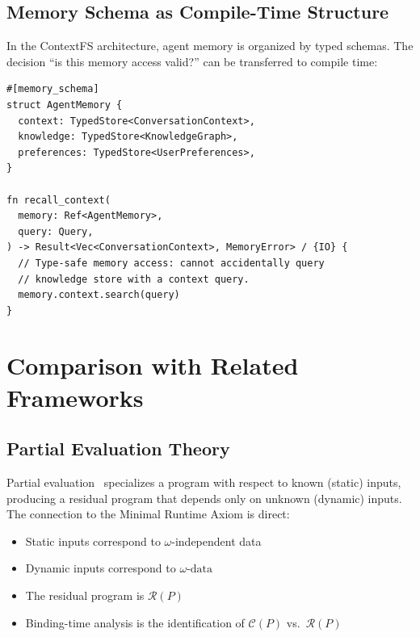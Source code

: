 \documentclass[11pt]{article}
\newcommand{\CP}{\mathcal{C}(P)}
\newcommand{\RP}{\mathcal{R}(P)}
\newcommand{\omegadata}{\omega\text{-data}}
\begin{document}
\subsection{Memory Schema as Compile-Time Structure}

In the ContextFS architecture, agent memory is organized by typed schemas. The decision
``is this memory access valid?'' can be transferred to compile time:

\begin{lstlisting}[caption={Typed agent memory in JAPL}]
#[memory_schema]
struct AgentMemory {
  context: TypedStore<ConversationContext>,
  knowledge: TypedStore<KnowledgeGraph>,
  preferences: TypedStore<UserPreferences>,
}

fn recall_context(
  memory: Ref<AgentMemory>,
  query: Query,
) -> Result<Vec<ConversationContext>, MemoryError> / {IO} {
  // Type-safe memory access: cannot accidentally query
  // knowledge store with a context query.
  memory.context.search(query)
}
\end{lstlisting}


\section{Comparison with Related Frameworks}
\label{sec:related}

\subsection{Partial Evaluation Theory}

Partial evaluation~\cite{jones1993partial} specializes a program with respect to known
(static) inputs, producing a residual program that depends only on unknown (dynamic)
inputs. The connection to the Minimal Runtime Axiom is direct:

\begin{itemize}[nosep]
  \item Static inputs correspond to $\omega$-independent data
  \item Dynamic inputs correspond to $\omegadata$
  \item The residual program is $\RP$
  \item Binding-time analysis is the identification of $\CP$ vs.\ $\RP$
\end{itemize}
\end{document}

